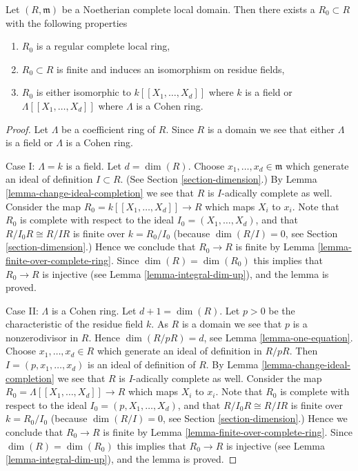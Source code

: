 \begin{lemma}
\label{lemma-complete-local-Noetherian-domain-finite-over-regular}
Let $(R, \mathfrak m)$ be a Noetherian complete local domain.
Then there exists a $R_0 \subset R$ with the following properties
\begin{enumerate}
\item $R_0$ is a regular complete local ring,
\item $R_0 \subset R$ is finite and induces an isomorphism on
residue fields,
\item $R_0$ is either isomorphic to $k[[X_1, \ldots, X_d]]$ where $k$
is a field or $\Lambda[[X_1, \ldots, X_d]]$ where $\Lambda$ is a Cohen ring.
\end{enumerate}
\end{lemma}

\begin{proof}
Let $\Lambda$ be a coefficient ring of $R$.
Since $R$ is a domain we see that either $\Lambda$ is a field
or $\Lambda$ is a Cohen ring.

\medskip\noindent
Case I: $\Lambda = k$ is a field. Let $d = \dim(R)$.
Choose $x_1, \ldots, x_d \in \mathfrak m$
which generate an ideal of definition $I \subset R$.
(See Section \ref{section-dimension}.)
By Lemma \ref{lemma-change-ideal-completion} we see that $R$
is $I$-adically complete as well.
Consider the map $R_0 = k[[X_1, \ldots, X_d]] \to R$
which maps $X_i$ to $x_i$.
Note that $R_0$ is complete with respect to the ideal
$I_0 = (X_1, \ldots, X_d)$,
and that $R/I_0R \cong R/IR$ is finite over $k = R_0/I_0$
(because $\dim(R/I) = 0$, see Section \ref{section-dimension}.)
Hence we conclude that $R_0 \to R$ is finite by
Lemma \ref{lemma-finite-over-complete-ring}.
Since $\dim(R) = \dim(R_0)$ this implies that
$R_0 \to R$ is injective (see Lemma \ref{lemma-integral-dim-up}),
and the lemma is proved.

\medskip\noindent
Case II: $\Lambda$ is a Cohen ring. Let $d + 1 = \dim(R)$.
Let $p > 0$ be the characteristic of the residue field $k$.
As $R$ is a domain we see that $p$ is a nonzerodivisor in $R$.
Hence $\dim(R/pR) = d$, see Lemma \ref{lemma-one-equation}.
Choose $x_1, \ldots, x_d \in R$
which generate an ideal of definition in $R/pR$.
Then $I = (p, x_1, \ldots, x_d)$ is an ideal of definition of $R$.
By Lemma \ref{lemma-change-ideal-completion} we see that $R$
is $I$-adically complete as well.
Consider the map $R_0 = \Lambda[[X_1, \ldots, X_d]] \to R$
which maps $X_i$ to $x_i$.
Note that $R_0$ is complete with respect to the ideal
$I_0 = (p, X_1, \ldots, X_d)$,
and that $R/I_0R \cong R/IR$ is finite over $k = R_0/I_0$
(because $\dim(R/I) = 0$, see Section \ref{section-dimension}.)
Hence we conclude that $R_0 \to R$ is finite by
Lemma \ref{lemma-finite-over-complete-ring}.
Since $\dim(R) = \dim(R_0)$ this implies that
$R_0 \to R$ is injective (see Lemma \ref{lemma-integral-dim-up}),
and the lemma is proved.
\end{proof}
